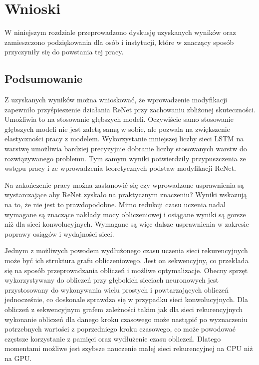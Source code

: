 \documentclass[oneside, mag]{mgr}
\begin{document}
\chapter{Wnioski}

W niniejszym rozdziale przeprowadzono dyskusję uzyskanych wyników oraz zamieszczono podziękowania dla osób i instytucji, które w znaczący sposób przyczyniły się do powstania tej pracy.

\section{Podsumowanie}

Z uzyskanych wyników można wnioskować, że wprowadzenie modyfikacji zapewniło przyśpieszenie działania ReNet przy zachowaniu zbliżonej skuteczności. Umożliwia to na stosowanie głębszych modeli. Oczywiście samo stosowanie głębszych modeli nie jest zaletą samą w sobie, ale pozwala na zwiększenie elastyczności pracy z modelem. Wykorzystanie mniejszej liczby sieci LSTM na warstwę umożliwia bardziej precyzyjnie dobranie liczby stosowanych warstw do rozwiązywanego problemu. Tym samym wyniki potwierdziły przypuszczenia ze wstępu pracy i ze wprowadzenia teoretycznych podstaw modyfikacji ReNet.

Na zakończenie pracy można zastanowić się czy wprowadzone usprawnienia są wystarczające aby ReNet zyskało na praktycznym znaczeniu? Wyniki wskazują na to, że nie jest to prawdopodobne. Mimo redukcji czasu uczenia nadal wymagane są znaczące nakłady mocy obliczeniowej i osiągane wyniki są gorsze niż dla sieci konwolucyjnych. Wymagane są więc dalsze usprawnienia w zakresie poprawy osiągów i wydajności sieci. 

Jednym z możliwych powodem wydłużonego czasu uczenia sieci rekurencyjnych może być ich struktura grafu obliczeniowego. Jest on sekwencyjny, co przekłada się na sposób przeprowadzania obliczeń i możliwe optymalizacje. Obecny sprzęt wykorzystywany do obliczeń przy głębokich sieciach neuronowych jest przystosowany do wykonywania wielu prostych i powtarzających obliczeń jednocześnie, co doskonale sprawdza się w przypadku sieci konwolucyjnych. Dla obliczeń z sekwencyjnym grafem zależności takim jak dla sieci rekurencyjnych wykonanie obliczeń dla danego kroku czasowego może nastąpić po wyznaczeniu potrzebnych wartości z poprzedniego kroku czasowego, co może powodować częstsze korzystanie z pamięci oraz wydłużenie czasu obliczeń. Dlatego momentami możliwe jest szybsze nauczenie małej sieci rekurencyjnej na CPU niż na GPU. 
\end{document}
